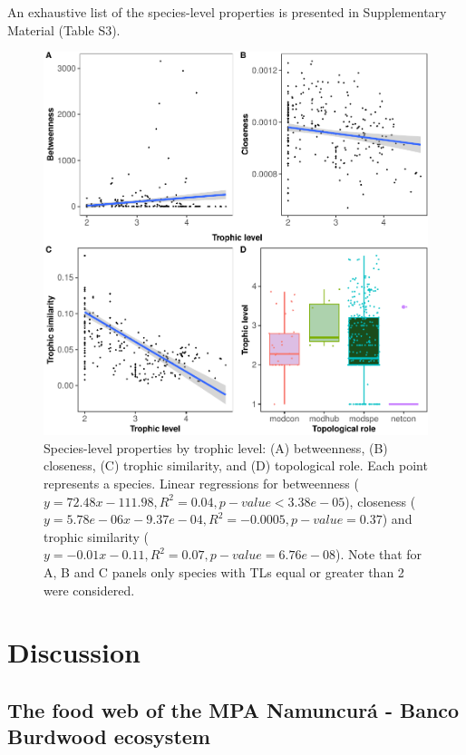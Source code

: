 \documentclass[preprint, 3p,
authoryear]{elsarticle} %
\begin{document}
An exhaustive list of the species-level properties is presented in
Supplementary Material (Table S3).

\begin{figure}

{\centering \includegraphics{MS_Burdwood_foodweb_files/figure-latex/figure4-1} 

}

\caption{Species-level properties by trophic level: (A) betweenness, (B) closeness, (C) trophic similarity, and (D) topological role. Each point represents a species. Linear regressions for betweenness ($y = 72.48x - 111.98, R^2 = 0.04, p-value < 3.38e-05$), closeness ($y = 5.78e-06x - 9.37e-04, R^2 = -0.0005, p-value = 0.37$) and trophic similarity ($y = -0.01x - 0.11, R^2 = 0.07, p-value = 6.76e-08$). Note that for A, B and C panels only species with TLs equal or greater than 2 were considered.}\label{fig:figure4}
\end{figure}

\hypertarget{discussion}{%
\section{Discussion}\label{discussion}}

\hypertarget{the-food-web-of-the-mpa-namuncuruxe1---banco-burdwood-ecosystem}{%
\subsection{The food web of the MPA Namuncurá - Banco Burdwood
ecosystem}\label{the-food-web-of-the-mpa-namuncuruxe1---banco-burdwood-ecosystem}}
\end{document}
